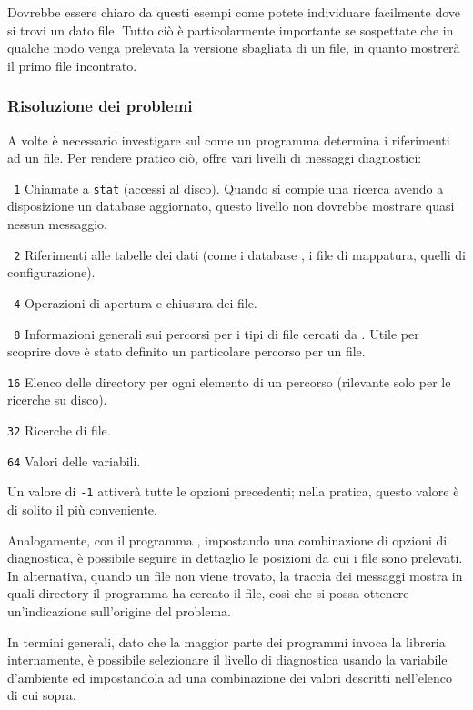 \documentclass{article}
\begin{document}
Dovrebbe essere chiaro da questi esempi come potete individuare facilmente
dove si trovi un dato file. Tutto ciò è particolarmente importante se
sospettate che in qualche modo venga prelevata la versione sbagliata di un
file, in quanto  mostrerà il primo file incontrato.

\subsubsection{Risoluzione dei problemi}
\label{sec:debugging}

A volte è necessario investigare sul come un programma determina i
riferimenti ad un file. Per rendere pratico ciò, \KPS{} offre vari livelli
di messaggi diagnostici:

\begin{ttdescription}
\item[\texttt{\ 1}] Chiamate a \texttt{stat} (accessi al disco). Quando si
  compie una ricerca avendo a disposizione un database 
  aggiornato, questo livello non dovrebbe mostrare quasi nessun messaggio.
\item[\texttt{\ 2}] Riferimenti alle tabelle dei dati (come i database
  , i file di mappatura, quelli di configurazione).
\item[\texttt{\ 4}] Operazioni di apertura e chiusura dei file.
\item[\texttt{\ 8}] Informazioni generali sui percorsi per i tipi di file
  cercati da \KPS. Utile per scoprire dove è stato definito un particolare
  percorso per un file.
\item[\texttt{16}] Elenco delle directory per ogni elemento di un percorso
  (rilevante solo per le ricerche su disco).
\item[\texttt{32}] Ricerche di file.
\item[\texttt{64}] Valori delle variabili.
\end{ttdescription}
Un valore di \texttt{-1} attiverà tutte le opzioni precedenti; nella
pratica, questo valore è di solito il più conveniente.

Analogamente, con il programma , impostando una
combinazione di opzioni di diagnostica, è possibile seguire in dettaglio
le posizioni da cui i file sono prelevati. In alternativa, quando un file
non viene trovato, la traccia dei messaggi mostra in quali directory il
programma ha cercato il file, così che si possa ottenere un'indicazione
sull'origine del problema.

In termini generali, dato che la maggior parte dei programmi invoca la
libreria \KPS{} internamente, è possibile selezionare il livello di
diagnostica usando la variabile d'ambiente  ed
impostandola ad una combinazione dei valori descritti nell'elenco di cui
sopra.
\end{document}
